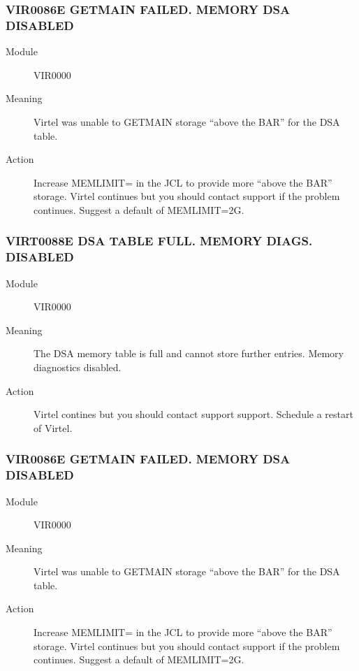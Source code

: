 \documentclass[letterpaper,10pt,english]{sphinxmanual}
\begin{document}
\subsubsection{VIR0086E GETMAIN FAILED. MEMORY DSA DISABLED}
\label{\detokenize{messages:vir0086e-getmain-failed-memory-dsa-disabled}}\begin{description}
\item[{Module}] \leavevmode
VIR0000

\item[{Meaning}] \leavevmode
Virtel was unable to GETMAIN storage “above the BAR” for the DSA table.

\item[{Action}] \leavevmode
Increase MEMLIMIT= in the JCL to provide more “above the BAR” storage. Virtel continues but you should contact support if the problem continues. Suggest a default of MEMLIMIT=2G.

\end{description}


\subsubsection{VIRT0088E DSA TABLE FULL. MEMORY DIAGS. DISABLED}
\label{\detokenize{messages:virt0088e-dsa-table-full-memory-diags-disabled}}\begin{description}
\item[{Module}] \leavevmode
VIR0000

\item[{Meaning}] \leavevmode
The DSA memory table is full and cannot store further entries. Memory diagnostics disabled.

\item[{Action}] \leavevmode
Virtel contines but you should contact support support. Schedule a restart of Virtel.

\end{description}


\subsubsection{VIR0086E GETMAIN FAILED. MEMORY DSA DISABLED}
\label{\detokenize{messages:id6}}\begin{description}
\item[{Module}] \leavevmode
VIR0000

\item[{Meaning}] \leavevmode
Virtel was unable to GETMAIN storage “above the BAR” for the DSA table.

\item[{Action}] \leavevmode
Increase MEMLIMIT= in the JCL to provide more “above the BAR” storage. Virtel continues but you should contact support if the problem continues. Suggest a default of MEMLIMIT=2G.

\end{description}
\end{document}
